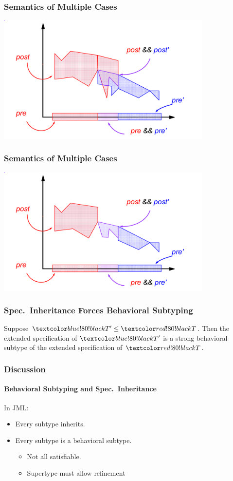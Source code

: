 \begin{frame}
\frametitle{Semantics of Multiple Cases}
\transdissolve[duration=0.5]
\includegraphics[width=4.25in]{join-both}
\end{frame}

\begin{frame}
\frametitle{Semantics of Multiple Cases}
\includegraphics[width=4.25in]{join-intersect}
\end{frame}

\begin{frame}
\frametitle{Spec.~Inheritance Forces Behavioral Subtyping}
\begin{theorem}
Suppose $\BLUETP \STO \REDT$.
Then the extended specification of $\BLUETP$
is a strong behavioral subtype of
the extended specification of $\REDT$.
\end{theorem}
\end{frame}

\begin{frame}
\frametitle{Discussion}
\framesubtitle{Behavioral Subtyping and Spec.~Inheritance}

In JML:
\begin{itemize}
\item
Every subtype inherits.

\item
Every subtype is a behavioral subtype.
\begin{itemize}
\item
Not all satisfiable.

\item
Supertype must allow refinement
\end{itemize}
\end{itemize}
\end{frame}

